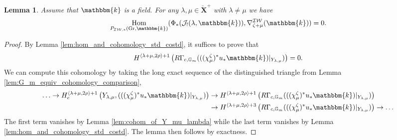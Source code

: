 \documentclass{amsart}
\newcommand{\G}{\mathbb{G}}
\renewcommand{\k}{\mathbbm{k}}
\newcommand{\scrJ}{\mathcal{J}}
\newcommand{\bfXv}{\check{\mathbf{X}}}
\newcommand{\IW}{\mathcal{IW}}
\DeclareMathOperator{\Hom}{Hom}
\DeclareMathOperator{\Gr}{Gr}
\newtheorem{lemma}[subsubsection]{Lemma}
\theoremstyle{definition}
\begin{document}
    \begin{lemma}\label{lem:hom_vanishing_between_Phi_and_costds}
        Assume that $\k$ is a field. For any $\lambda, \mu \in \bfXv^+$ with $\lambda \neq \mu$ we have
        \[\Hom_{P_{\IW, *} (\Gr, \k)} (\Phi_* (\scrJ_! (\lambda, \k)), \nabla_{\zeta + \mu}^{\IW} (\k)) = 0.\]
    \end{lemma}
    \begin{proof}
        By Lemma \ref{lem:hom_and_cohomology_std_costd}, it suffices to prove that
        \[H^{\langle \lambda + \mu, 2\rho \rangle+ 1} \left( R\Gamma_{c, \G_m} (((\chi_{\mu}^{\zeta})^* u_* \k)\vert_{Y_{\lambda, \mu}} )\right) = 0.\]
        We can compute this cohomology by taking the long exact sequence of the distinguished triangle from Lemma \ref{lem:G_m_equiv_cohomology_comparison},
        \begin{align*}
            \ldots \to H_c^{\langle \lambda + \mu, 2\rho \rangle+ 1} \left( Y_{\lambda, \mu}, (((\chi_{\mu}^{\zeta})^* u_* \k)\vert_{Y_{\lambda, \mu}} )\right) &\to H^{\langle \lambda + \mu, 2\rho \rangle+ 1} \left( R\Gamma_{c, \G_m} (((\chi_{\mu}^{\zeta})^* u_* \k)\vert_{Y_{\lambda, \mu}} )\right) \\
            &\to H^{\langle \lambda + \mu, 2\rho \rangle+ 3} \left( R\Gamma_{c, \G_m} (((\chi_{\mu}^{\zeta})^* u_* \k)\vert_{Y_{\lambda, \mu}} )\right) \to \ldots
        \end{align*}
        The first term vanishes by Lemma \ref{lem:cohom_of_Y_mu_lambda} while the last term vanishes by Lemma \ref{lem:hom_and_cohomology_std_costd}.
        The lemma then follows by exactness.
    \end{proof}
\end{document}
